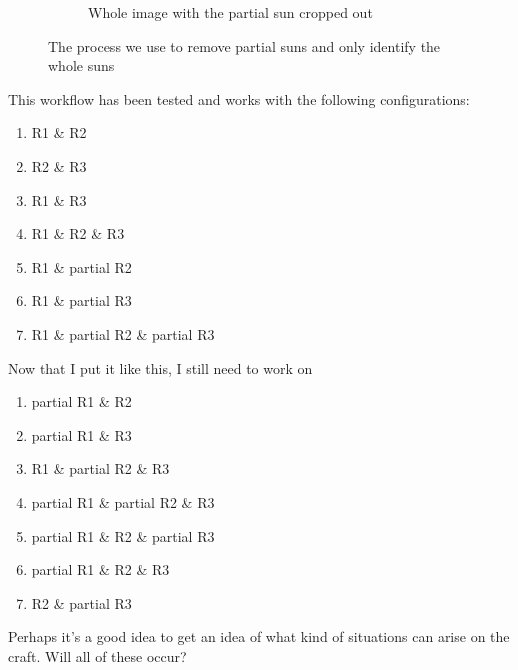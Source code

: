 \documentclass[10pt]{scrartcl}
\begin{document}
\begin{figure}[!ht]
\begin{subfigure}{.49\textwidth}
        \caption{Whole image with the partial sun cropped out}
        \label{fixed_image}
    \end{subfigure}
    \caption{The process we use to remove partial suns and only identify the whole suns}
    \label{fixtheregion}
\end{figure}

This workflow has been tested and works with the following configurations:
\begin{enumerate}
    \item R1 \& R2
    \item R2 \& R3
    \item R1 \& R3
    \item R1 \& R2 \& R3
    \item R1 \& partial R2
    \item R1 \& partial R3
    \item R1 \& partial R2 \& partial R3
\end{enumerate}


Now that I put it like this, I still need to work on
\begin{enumerate}
    \item partial R1 \& R2
    \item partial R1 \& R3
    \item R1 \& partial R2 \& R3
    \item partial R1 \& partial R2 \& R3
    \item partial R1 \& R2 \& partial R3
    \item partial R1 \& R2 \& R3
    \item R2 \& partial R3
\end{enumerate}

Perhaps it's a good idea to get an idea of what kind of situations can arise on the craft. Will all of these occur?


\end{document}
